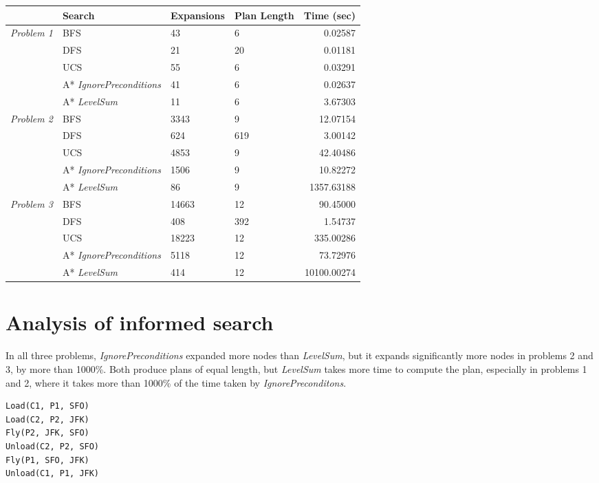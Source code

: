 \documentclass[10pt,a4paper]{article}
\begin{document}
\begin{tabular}{|c|l|l|l|r|}
    \hline
    & \textbf{Search} & \textbf{Expansions}
    & \textbf{Plan Length} & \textbf{Time (sec)} \\
    \hline
    \multirow{4}{*}{\textit{Problem 1}} & BFS & 43 & 6 & 0.02587 \\
    \cline{2-5}
    & DFS & 21 & 20 & 0.01181 \\
    \cline{2-5}
    & UCS & 55 & 6 & 0.03291 \\
    \cline{2-5}
    & A* \textit{IgnorePreconditions} & 41 & 6 & 0.02637 \\
    \cline{2-5}
    & A* \textit{LevelSum} & 11 & 6 & 3.67303 \\
    \hline
    \multirow{4}{*}{\textit{Problem 2}} & BFS & 3343 & 9 & 12.07154 \\
    \cline{2-5}
    & DFS & 624 & 619 & 3.00142 \\
    \cline{2-5}
    & UCS & 4853 & 9 & 42.40486 \\
    \cline{2-5}
    & A* \textit{IgnorePreconditions} & 1506 & 9 & 10.82272 \\
    \cline{2-5}
    & A* \textit{LevelSum} & 86 & 9 & 1357.63188 \\
    \hline
    \multirow{4}{*}{\textit{Problem 3}} & BFS & 14663 & 12 & 90.45000 \\
    \cline{2-5}
    & DFS & 408 & 392 & 1.54737 \\
    \cline{2-5}
    & UCS & 18223 & 12 & 335.00286 \\
    \cline{2-5}
    & A* \textit{IgnorePreconditions} & 5118 & 12 & 73.72976 \\
    \cline{2-5}
    & A* \textit{LevelSum} & 414 & 12 & 10100.00274 \\
    \hline
\end{tabular}

\section*{Analysis of informed search}

In all three problems, \textit{IgnorePreconditions} expanded more nodes than
\textit{LevelSum}, but it expands significantly more nodes in problems 2 and 3,
by more than 1000\%. Both produce plans of equal length, but \textit{LevelSum}
takes more time to compute the plan, especially in problems 1 and 2, where
it takes more than 1000\% of the time taken by \textit{IgnorePreconditons}.

\begin{mdframed}[frametitle={Problem 1: Optimal Plan},
                 backgroundcolor=light-grey, roundcorner=10pt,
                 leftmargin=1, rightmargin=1,
                 innerleftmargin=15, innerrightmargin=15,
                 innertopmargin=15, innerbottommargin=15,
                 outerlinewidth=1, linecolor=light-grey]
\begin{lstlisting}
Load(C1, P1, SFO)
Load(C2, P2, JFK)
Fly(P2, JFK, SFO)
Unload(C2, P2, SFO)
Fly(P1, SFO, JFK)
Unload(C1, P1, JFK)
\end{lstlisting}
\end{mdframed}
\end{document}
